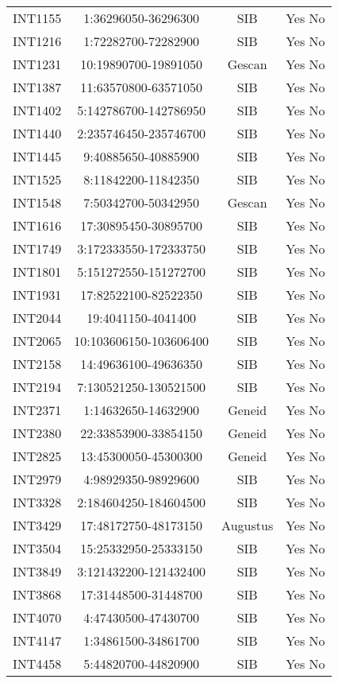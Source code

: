 \begin{table}[h]
\begin{tabular}{lccc}
	INT1155 & 1:36296050-36296300 & SIB & Yes No \\
	INT1216 & 1:72282700-72282900 & SIB & Yes No \\
	INT1231 & 10:19890700-19891050 & Gescan & Yes No \\
	INT1387 & 11:63570800-63571050 & SIB & Yes No \\
	INT1402 & 5:142786700-142786950 & SIB & Yes No \\
	INT1440 & 2:235746450-235746700 & SIB & Yes No \\
	INT1445 & 9:40885650-40885900 & SIB & Yes No \\
	INT1525 & 8:11842200-11842350 & SIB & Yes No \\
	INT1548 & 7:50342700-50342950 & Gescan & Yes No \\
	INT1616 & 17:30895450-30895700 & SIB & Yes No \\
	INT1749 & 3:172333550-172333750 & SIB & Yes No \\
	INT1801 & 5:151272550-151272700 & SIB & Yes No \\
	INT1931 & 17:82522100-82522350 & SIB & Yes No \\
	INT2044 & 19:4041150-4041400 & SIB & Yes No \\
	INT2065 & 10:103606150-103606400 & SIB & Yes No \\
	INT2158 & 14:49636100-49636350 & SIB & Yes No \\
	INT2194 & 7:130521250-130521500 & SIB & Yes No \\
	INT2371 & 1:14632650-14632900 & Geneid & Yes No \\
	INT2380 & 22:33853900-33854150 & Geneid & Yes No \\
	INT2825 & 13:45300050-45300300 & Geneid & Yes No \\
	INT2979 & 4:98929350-98929600 & SIB & Yes No \\
	INT3328 & 2:184604250-184604500 & SIB & Yes No \\
	INT3429 & 17:48172750-48173150 & Augustus & Yes No \\
	INT3504 & 15:25332950-25333150 & SIB & Yes No \\
	INT3849 & 3:121432200-121432400 & SIB & Yes No \\
	INT3868 & 17:31448500-31448700 & SIB & Yes No \\
	INT4070 & 4:47430500-47430700 & SIB & Yes No \\
	INT4147 & 1:34861500-34861700 & SIB & Yes No \\
	INT4458 & 5:44820700-44820900 & SIB & Yes No \\

\end{tabular}
\end{table}
